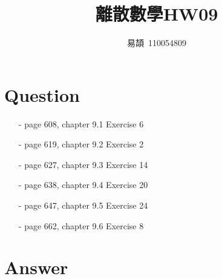 \documentclass[sigconf]{acmart}
\begin{document}
\title{離散數學HW09}

\author{易頡~110054809}
\orcid{}

\renewcommand\footnotetextcopyrightpermission[1]{} %
\pagestyle{plain} %

\maketitle

\section{Question}
\begin{itemize}
	\item[-] page 608, chapter 9.1 Exercise 6
	\item[-] page 619, chapter 9.2 Exercise 2
	\item[-] page 627, chapter 9.3 Exercise 14
	\item[-] page 638, chapter 9.4 Exercise 20
	\item[-] page 647, chapter 9.5 Exercise 24
	\item[-] page 662, chapter 9.6 Exercise 8
\end{itemize}

\section{Answer}
\end{document}
